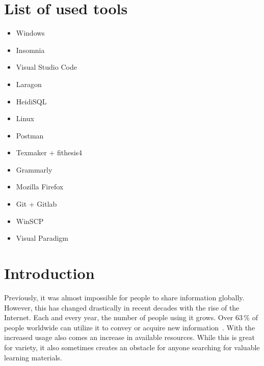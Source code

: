 \documentclass[
  digital,     %
  oneside,     %
  nosansbold,  %
  colorbold, %
  lof,         %
  lot,         %
]{fithesis4}
\begin{document}

\chapter*{List of used tools}
\begin{itemize}
	\item Windows
	\item Insomnia
	\item Visual Studio Code
	\item Laragon
	\item HeidiSQL
	\item Linux
	\item Postman
	\item Texmaker + fithesis4
	\item Grammarly
	\item Mozilla Firefox
	\item Git + Gitlab
	\item WinSCP
	\item Visual Paradigm
\end{itemize}

\chapter{Introduction}

Previously, it was almost impossible for people to share information globally.
However, this has changed drastically in recent decades with the rise of the
Internet. Each and every year, the number of people using it grows. Over
63\,\% of people worldwide can utilize it to convey or acquire new
information~\cite{w3_wordpress}. With the increased usage also comes
an increase in available resources. While this is great for variety, it also
sometimes creates an obstacle for anyone searching for valuable learning
materials.
\end{document}
